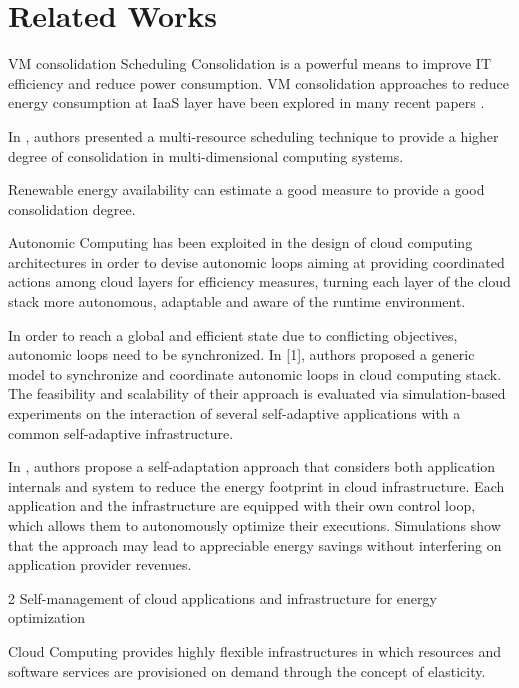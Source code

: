 \section{Related Works}
\label{sec: relworks}

VM consolidation
Scheduling
Consolidation is a powerful means to improve IT efficiency and reduce power consumption. VM consolidation approaches to reduce energy consumption at IaaS layer have been explored in many recent papers \cite{Cardosa} \cite{ITProf1} \cite{Schroder} \cite{Hermenier2009} \cite{sheikhalishahi_energy_2011}.

In \cite{sheikhalishahi_multi-capacity_2014}, authors presented a multi-resource scheduling technique to provide a higher degree of consolidation in multi-dimensional computing systems.

Renewable energy availability can estimate a good measure to provide a good consolidation degree.

Autonomic Computing has been exploited in the design of cloud computing architectures in order to devise autonomic loops aiming at providing coordinated actions among cloud layers for efficiency measures, turning each layer of the cloud stack more autonomous, adaptable and aware of the runtime environment.

In order to reach a global and efficient state due to conflicting objectives, autonomic loops need to be synchronized. In [1], authors proposed a generic model to synchronize and coordinate autonomic loops in cloud computing stack. The feasibility and scalability of their approach is evaluated via simulation-based experiments on the interaction of several self-adaptive applications with a common self-adaptive infrastructure.


In \cite{2}, authors propose a self-adaptation approach that considers both application internals and system to reduce the energy footprint in cloud infrastructure. Each application and the infrastructure are equipped with their own control loop, which allows them to autonomously optimize their executions. Simulations show that the approach may lead to appreciable energy savings without interfering on application provider revenues.

2 Self-management of cloud applications and infrastructure for energy optimization

Cloud Computing provides highly flexible infrastructures in which resources and software services are provisioned on demand through the concept of elasticity.


